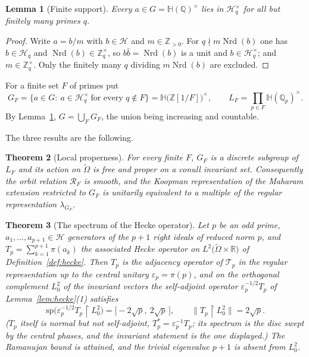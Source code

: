 \documentclass[11pt]{amsart}
\numberwithin{equation}{section}
\newtheorem{theorem}{Theorem}[section]
\newtheorem{lemma}[theorem]{Lemma}
\theoremstyle{definition}
\theoremstyle{remark}
\newcommand{\Z}{\mathbb{Z}}
\newcommand{\Q}{\mathbb{Q}}
\newcommand{\R}{\mathbb{R}}
\newcommand{\HH}{\mathbb{H}}
\newcommand{\cH}{\mathcal{H}}
\newcommand{\cT}{\mathcal{T}}
\newcommand{\cR}{\mathcal{R}}
\newcommand{\Nrd}{\operatorname{Nrd}}
\begin{document}
\begin{lemma}[Finite support]\label{lem:support}
Every $a\in G=\HH(\Q)^\times$ lies in $\cH_q^\times$ for all but finitely many primes $q$.
\end{lemma}

\begin{proof}
Write $a=b/m$ with $b\in\cH$ and $m\in\Z_{>0}$. For $q\nmid m\Nrd(b)$ one has $b\in\cH_q$ and
$\Nrd(b)\in\Z_q^\times$, so $b\bar b=\Nrd(b)$ is a unit and $b\in\cH_q^\times$; and
$m\in\Z_q^\times$. Only the finitely many $q$ dividing $m\Nrd(b)$ are excluded.
\end{proof}

For a finite set $F$ of primes put
\[
G_F=\bigl\{a\in G:\ a\in\cH_q^\times\ \text{for every } q\notin F\bigr\}=\HH\bigl(\Z[1/F]\bigr)^\times,
\qquad L_F=\prod_{p\in F}\HH(\Q_p)^\times .
\]
By Lemma~\ref{lem:support}, $G=\bigcup_FG_F$, the union being increasing and countable.

\medskip
The three results are the following.

\begin{theorem}[Local properness]\label{thm:proper}
For every finite $F$, $G_F$ is a discrete subgroup of $L_F$ and its action on $\widetilde\Omega$
is free and proper on a conull invariant set. Consequently the orbit relation $\cR_F$ is smooth,
and the Koopman representation of the Maharam extension restricted to $G_F$ is unitarily
equivalent to a multiple of the regular representation $\lambda_{G_F}$.
\end{theorem}

\begin{theorem}[The spectrum of the Hecke operator]\label{thm:spec}
Let $p$ be an odd prime, $a_1,\dots,a_{p+1}\in\cH$ generators of the $p+1$ right ideals of reduced
norm $p$, and $T_p=\sum_{k=1}^{p+1}\pi(a_k)$ the associated Hecke operator on
$L^2\bigl(\widetilde\Omega\times\R\bigr)$ of Definition~\ref{def:hecke}. Then $T_p$ is the
adjacency operator of $\cT_p$ in the regular representation up to the central unitary
$\varepsilon_p=\pi(p)$, and on the orthogonal complement
$L^2_0$ of the invariant vectors the self-adjoint operator $\varepsilon_p^{-1/2}T_p$ of
Lemma~\ref{lem:hecke}(1) satisfies
\[
\mathrm{sp}\bigl(\varepsilon_p^{-1/2}T_p\restriction L^2_0\bigr)=\bigl[-2\sqrt p,\ 2\sqrt p\,\bigr],
\qquad \bigl\|T_p\restriction L^2_0\bigr\|=2\sqrt p .
\]
($T_p$ itself is normal but not self-adjoint, $T_p^*=\varepsilon_p^{-1}T_p$; its spectrum is
the disc swept by the central phases, and the invariant statement is the one displayed.)
The Ramanujan bound is attained, and the trivial eigenvalue $p+1$ is absent from $L^2_0$.
\end{theorem}
\end{document}

